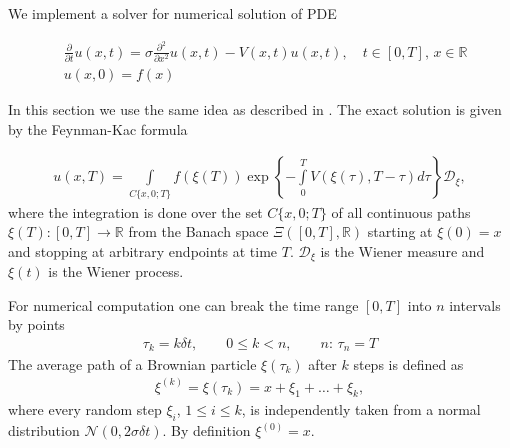\documentclass[11pt,a4paper]{extarticle}
\begin{document}
We implement a solver for numerical solution of PDE

\begin{equation}
     \begin{aligned}
     \nonumber
        & \frac\partial{\partial t} u(x, t) = \sigma \frac{\partial^2}{\partial x^2} u(x, t) - V(x, t) u(x, t), \quad t\in [0, T], \, x\in \mathbb R \\
        & u(x, 0) = f(x)
     \end{aligned}
\end{equation}

In this section we use the same idea as described in \cite{oseledets}.
The exact solution is given by the Feynman-Kac formula

\begin{equation}
    \begin{aligned}
    \nonumber
        u(x, T) = \int\limits_{C\{x, 0; T\}} f(\xi(T)) \exp\left\{ -\int\limits_0^T V(\xi(\tau), T-\tau) d\tau \right\} \mathcal D_\xi,
    \end{aligned}
\end{equation}
where the integration is done over the set $C\{x, 0; T\}$ of all continuous paths $\xi(T) : [0, T] \rightarrow \mathbb R$ from the Banach space $\Xi([0, T], \mathbb R)$ starting at $\xi(0) = x$ and stopping at arbitrary endpoints at time $T$.
$\mathcal D_\xi$ is the Wiener measure and $\xi(t)$ is the Wiener process.

For numerical computation one can break the time range $[0, T]$ into $n$ intervals by points
\begin{equation}
    \begin{aligned}
    \nonumber
        \tau_k = k \delta t, \qquad 0 \leq k < n, \qquad n: \, \tau_n = T
    \end{aligned}
\end{equation}
The average path of a Brownian particle $\xi(\tau_k)$ after $k$ steps is defined as
\begin{equation}
    \begin{aligned}
    \nonumber
        \xi^{(k)} = \xi(\tau_k) = x + \xi_1 + \dots + \xi_k,
    \end{aligned}
\end{equation}
where every random step $\xi_i$, $1 \leq i \leq k$, is independently taken from a normal distribution $\mathcal N(0, 2\sigma\delta t)$.
By definition $\xi^{(0)} = x$.
\end{document}
